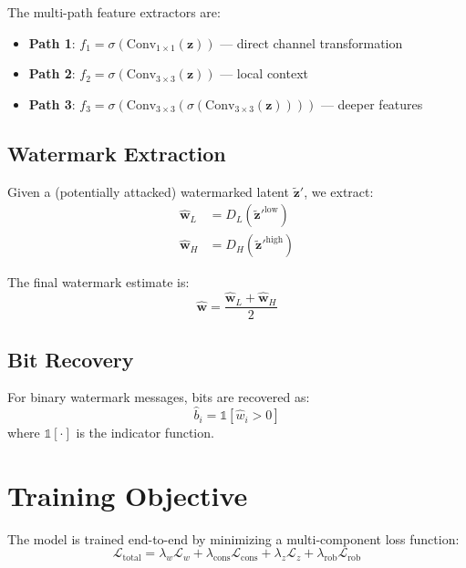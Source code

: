 \documentclass[11pt]{article}
\begin{document}
The multi-path feature extractors are:
\begin{itemize}
    \item \textbf{Path 1}: $f_1 = \sigma(\text{Conv}_{1 \times 1}(\mathbf{z}))$ --- direct channel transformation
    \item \textbf{Path 2}: $f_2 = \sigma(\text{Conv}_{3 \times 3}(\mathbf{z}))$ --- local context
    \item \textbf{Path 3}: $f_3 = \sigma(\text{Conv}_{3 \times 3}(\sigma(\text{Conv}_{3 \times 3}(\mathbf{z}))))$ --- deeper features
\end{itemize}

\subsection{Watermark Extraction}

Given a (potentially attacked) watermarked latent $\tilde{\mathbf{z}}'$, we extract:
\begin{align}
    \hat{\mathbf{w}}_L &= D_L(\tilde{\mathbf{z}}'^{\text{low}}) \\
    \hat{\mathbf{w}}_H &= D_H(\tilde{\mathbf{z}}'^{\text{high}})
\end{align}

The final watermark estimate is:
\begin{equation}
    \hat{\mathbf{w}} = \frac{\hat{\mathbf{w}}_L + \hat{\mathbf{w}}_H}{2}
\end{equation}

\subsection{Bit Recovery}

For binary watermark messages, bits are recovered as:
\begin{equation}
    \hat{b}_i = \mathbb{1}[\hat{w}_i > 0]
\end{equation}
where $\mathbb{1}[\cdot]$ is the indicator function.

\section{Training Objective}

The model is trained end-to-end by minimizing a multi-component loss function:
\begin{equation}
    \mathcal{L}_{\text{total}} = \lambda_w \mathcal{L}_w + \lambda_{\text{cons}} \mathcal{L}_{\text{cons}} + \lambda_z \mathcal{L}_z + \lambda_{\text{rob}} \mathcal{L}_{\text{rob}}
\end{equation}
\end{document}
